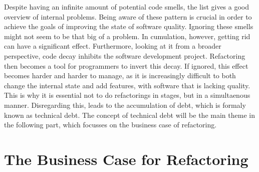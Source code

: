 Despite having an infinite amount of potential code smells,
	the list gives a good overview of internal problems.
Being aware of these pattern is crucial
	in order to achieve the goals of improving the state of software quality.
Ignoring these smells might not seem to be that big of a problem. 
In cumulation, 
	however, getting rid can have a significant effect.
Furthermore, 
	looking at it from a broader perspective, 
	code decay inhibits the software development project. 
Refactoring then becomes a tool for programmers to invert this decay.
If ignored, 
	this effect becomes harder and harder to manage, 
	as it is increasingly difficult to both change the internal state and 
	add features, with software that is lacking quality. 
This is why it is essential not to do refactorings in stages, 
	but in a simultaenous manner.
Disregarding this, 
	leads to the accumulation of debt, 
	which is formaly known as technical debt. 
The concept of technical debt will be the main theme 
	in the following part, 
	which focusses on the business case of refactoring.

\section{The Business Case for Refactoring}
\label{sec:Business}
